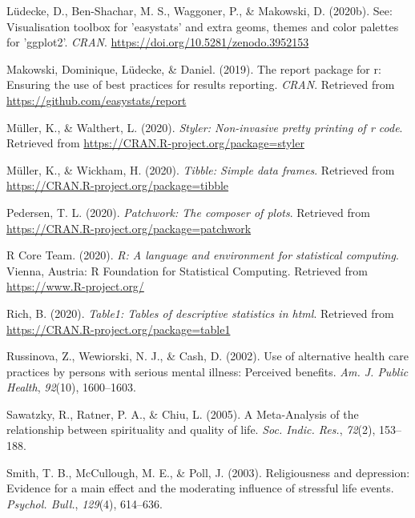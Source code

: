\documentclass[
  english,
  man]{apa6}
\begin{document}
\leavevmode\hypertarget{ref-R-see}{}%
Lüdecke, D., Ben-Shachar, M. S., Waggoner, P., \& Makowski, D. (2020b). See: Visualisation toolbox for 'easystats' and extra geoms, themes and color palettes for 'ggplot2'. \emph{CRAN}. \url{https://doi.org/10.5281/zenodo.3952153}

\leavevmode\hypertarget{ref-R-report}{}%
Makowski, Dominique, Lüdecke, \& Daniel. (2019). The report package for r: Ensuring the use of best practices for results reporting. \emph{CRAN}. Retrieved from \url{https://github.com/easystats/report}

\leavevmode\hypertarget{ref-R-styler}{}%
Müller, K., \& Walthert, L. (2020). \emph{Styler: Non-invasive pretty printing of r code}. Retrieved from \url{https://CRAN.R-project.org/package=styler}

\leavevmode\hypertarget{ref-R-tibble}{}%
Müller, K., \& Wickham, H. (2020). \emph{Tibble: Simple data frames}. Retrieved from \url{https://CRAN.R-project.org/package=tibble}

\leavevmode\hypertarget{ref-R-patchwork}{}%
Pedersen, T. L. (2020). \emph{Patchwork: The composer of plots}. Retrieved from \url{https://CRAN.R-project.org/package=patchwork}

\leavevmode\hypertarget{ref-R-base}{}%
R Core Team. (2020). \emph{R: A language and environment for statistical computing}. Vienna, Austria: R Foundation for Statistical Computing. Retrieved from \url{https://www.R-project.org/}

\leavevmode\hypertarget{ref-R-table1}{}%
Rich, B. (2020). \emph{Table1: Tables of descriptive statistics in html}. Retrieved from \url{https://CRAN.R-project.org/package=table1}

\leavevmode\hypertarget{ref-Russinova2002-rq}{}%
Russinova, Z., Wewiorski, N. J., \& Cash, D. (2002). Use of alternative health care practices by persons with serious mental illness: Perceived benefits. \emph{Am. J. Public Health}, \emph{92}(10), 1600--1603.

\leavevmode\hypertarget{ref-Sawatzky2005-rw}{}%
Sawatzky, R., Ratner, P. A., \& Chiu, L. (2005). A Meta-Analysis of the relationship between spirituality and quality of life. \emph{Soc. Indic. Res.}, \emph{72}(2), 153--188.

\leavevmode\hypertarget{ref-Smith2003-re}{}%
Smith, T. B., McCullough, M. E., \& Poll, J. (2003). Religiousness and depression: Evidence for a main effect and the moderating influence of stressful life events. \emph{Psychol. Bull.}, \emph{129}(4), 614--636.
\end{document}
